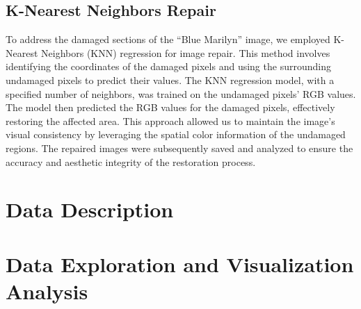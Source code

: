 \documentclass{article}
\begin{document}
\hypertarget{k-nearest-neighbors-repair}{%
\subsection{K-Nearest Neighbors
Repair}\label{k-nearest-neighbors-repair}}

To address the damaged sections of the ``Blue Marilyn'' image, we
employed K-Nearest Neighbors (KNN) regression for image repair. This
method involves identifying the coordinates of the damaged pixels and
using the surrounding undamaged pixels to predict their values. The KNN
regression model, with a specified number of neighbors, was trained on
the undamaged pixels' RGB values. The model then predicted the RGB
values for the damaged pixels, effectively restoring the affected area.
This approach allowed us to maintain the image's visual consistency by
leveraging the spatial color information of the undamaged regions. The
repaired images were subsequently saved and analyzed to ensure the
accuracy and aesthetic integrity of the restoration process.

\hypertarget{data-description}{%
\section{Data Description}\label{data-description}}

\hypertarget{data-exploration-and-visualization-analysis}{%
\section{Data Exploration and Visualization
Analysis}\label{data-exploration-and-visualization-analysis}}
\end{document}

